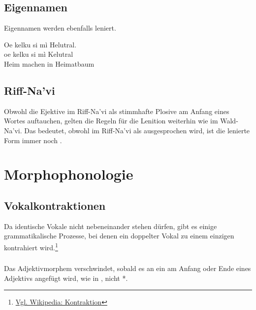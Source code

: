 \subsection{Eigennamen} Eigennamen werden ebenfalls leniert.

\begin{interlin} \label{lenition:ex01}
	\glll Oe kelku si mì Helutral. \\
	oe kelku si mì Kelutral \\
	 Heim machen in Heimatbaum \\
\end{interlin}


\subsection{Riff-Na'vi} 
Obwohl die Ejektive im Riff-Na'vi als stimmhafte Plosive am Anfang eines Wortes auftauchen, gelten die Regeln für die Lenition weiterhin wie im Wald-Na'vi. Das bedeutet, obwohl   im Riff-Na'vi als  ausgesprochen wird, ist die lenierte Form immer noch .

\section{Morphophonologie}

\subsection{Vokalkontraktionen} Da identische Vokale nicht nebeneinander stehen dürfen, gibt es einige grammatikalische Prozesse, bei denen ein doppelter Vokal zu einem einzigen kontrahiert wird.\footnote{\href{https://de.wikipedia.org/wiki/Kontraktion_(Linguistik)}{Vgl. Wikipedia: Kontraktion}}\label{lands:contract}

\subsubsection{} Das Adjektivmorphem  verschwindet, sobald es an ein  am Anfang oder Ende eines Adjektivs angefügt wird, wie in , nicht *.

